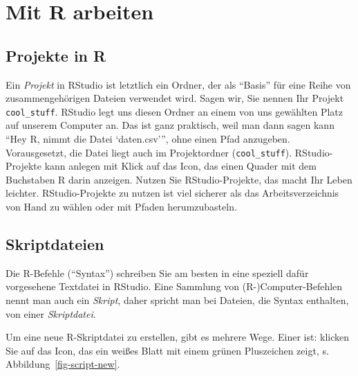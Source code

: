\documentclass[
  letterpaper,
  twoside,
  open=any]{scrbook}
\theoremstyle{definition}
\theoremstyle{definition}
\theoremstyle{definition}
\theoremstyle{remark}
\begin{document}
\section{Mit R arbeiten}\label{mit-r-arbeiten}

\subsection{Projekte in R}\label{projekte-in-r}

Ein \emph{Projekt} in RStudio ist letztlich ein Ordner, der als
\enquote{Basis} für eine Reihe von zusammengehörigen Dateien verwendet
wird. Sagen wir, Sie nennen Ihr Projekt \texttt{cool\_stuff}. RStudio
legt uns diesen Ordner an einem von uns gewählten Platz auf unserem
Computer an. Das ist ganz praktisch, weil man dann sagen kann
\enquote{Hey R, nimmt die Datei \enquote*{daten.csv}}, ohne einen Pfad
anzugeben. Vorausgesetzt, die Datei liegt auch im Projektordner
(\texttt{cool\_stuff}). RStudio-Projekte kann anlegen mit Klick auf das
Icon, das einen Quader mit dem Buchstaben R darin anzeigen. Nutzen Sie
RStudio-Projekte, das macht Ihr Leben leichter. RStudio-Projekte zu
nutzen ist viel sicherer als das Arbeitsverzeichnis von Hand zu wählen
oder mit Pfaden herumzubasteln.

\subsection{Skriptdateien}\label{skriptdateien}

Die R-Befehle (\enquote{Syntax}) schreiben Sie am besten in eine
speziell dafür vorgesehene Textdatei in RStudio. Eine Sammlung von
(R-)Computer-Befehlen nennt man auch ein \emph{Skript}, daher spricht
man bei Dateien, die Syntax enthalten, von einer \emph{Skriptdatei}.

Um eine neue R-Skriptdatei zu erstellen, gibt es mehrere Wege. Einer
ist: klicken Sie auf das Icon, das ein weißes Blatt mit einem grünen
Pluszeichen zeigt, s. Abbildung~\ref{fig-script-new}.
\end{document}
